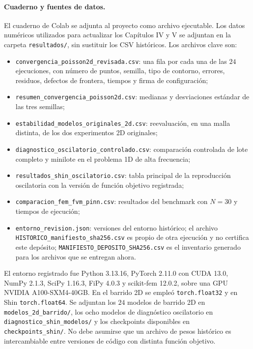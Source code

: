 \paragraph{Cuaderno y fuentes de datos.}
El cuaderno de Colab se adjunta al proyecto como archivo ejecutable.
Los datos numéricos utilizados para actualizar los Capítulos IV y V se adjuntan en la carpeta \texttt{resultados/}, sin sustituir los CSV históricos. Los archivos clave son:
\begin{itemize}
\item \texttt{convergencia\_poisson2d\_revisada.csv}: una fila por cada una de las $24$ ejecuciones, con número de puntos, semilla, tipo de contorno, errores, residuos, defectos de frontera, tiempos y firma de configuración;
\item \texttt{resumen\_convergencia\_poisson2d.csv}: medianas y desviaciones estándar de las tres semillas;
\item \texttt{estabilidad\_modelos\_originales\_2d.csv}: reevaluación, en una malla distinta, de los dos experimentos 2D originales;
\item \texttt{diagnostico\_oscilatorio\_controlado.csv}: comparación controlada de lote completo y minilote en el problema 1D de alta frecuencia;
\item \texttt{resultados\_shin\_oscilatorio.csv}: tabla principal de la reproducción oscilatoria con la versión de función objetivo registrada;
\item \texttt{comparacion\_fem\_fvm\_pinn.csv}: resultados del benchmark con $N=30$ y tiempos de ejecución;
\item \texttt{entorno\_revision.json}: versiones del entorno histórico; el archivo \texttt{HISTORICO\_manifiesto\_sha256.csv} es propio de otra ejecución y no certifica este depósito; \texttt{MANIFIESTO\_DEPOSITO\_SHA256.csv} es el inventario generado para los archivos que se entregan ahora.
\end{itemize}

El entorno registrado fue Python 3.13.16, PyTorch 2.11.0 con CUDA 13.0, NumPy 2.1.3, SciPy 1.16.3, FiPy 4.0.3 y scikit-fem 12.0.2, sobre una GPU NVIDIA A100-SXM4-40GB. En el barrido 2D se empleó \texttt{torch.float32} y en Shin \texttt{torch.float64}. Se adjuntan los $24$ modelos de barrido 2D en \texttt{modelos\_2d\_barrido/}, los ocho modelos de diagnóstico oscilatorio en \texttt{diagnostico\_shin\_modelos/} y los checkpoints disponibles en \texttt{checkpoints\_shin/}. No debe asumirse que un archivo de pesos histórico es intercambiable entre versiones de código con distinta función objetivo.

